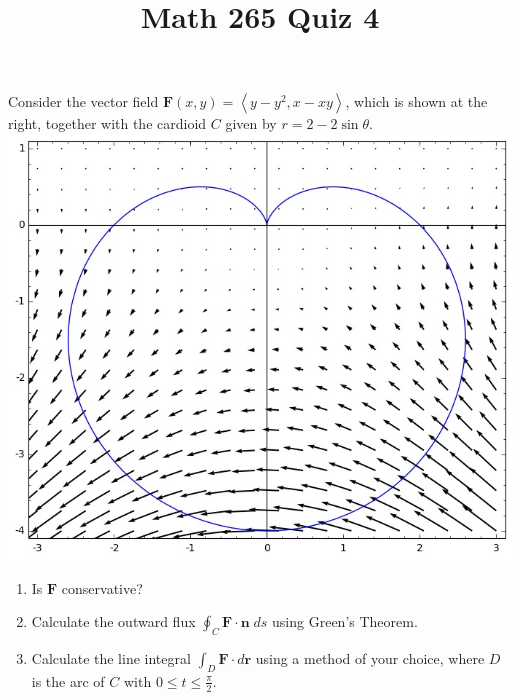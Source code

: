 \documentclass[12pt]{article}
\title{Math 265 Quiz 4}\author{}\date{}
\begin{document}
\maketitle
\thispagestyle{empty}
\begin{multicols}{2}
Consider the vector field $\mathbold{F}\left(x,y\right)
=\left\langle y-y^2,x-xy\right\rangle$, which is shown
at the right, together with the cardioid $C$
given by $r=2-2\sin{\theta}$.
\includegraphics[scale=.5]{Cardioid}
\end{multicols}
\begin{enumerate}
\item\label{FirstConservative} Is $\mathbold{F}$ conservative?
\item Calculate the outward flux $\oint_C\mathbold{F}
\cdot\mathbold{n}\;ds$ using Green's Theorem.
\item Calculate the line integral $\int_D\mathbold{F}
\cdot d\mathbold{r}$ using a method of your choice,
where $D$ is the arc of $C$ with $0\le t\le\frac{\pi}{2}$.
\end{enumerate}
\end{document}
